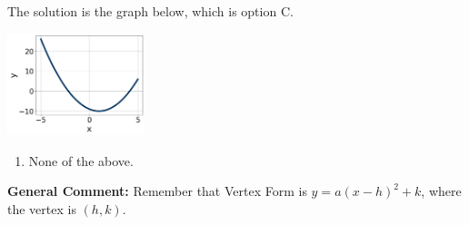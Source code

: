 \documentclass{extbook}[14pt]
\begin{document}
\begin{enumerate}
{The solution is the graph below, which is option C.
\begin{center}
    \includegraphics[width=0.3\textwidth]{../Figures/quadraticEquationToGraphCB.png}
\end{center}\begin{enumerate}[label=\Alph*.]
\item None of the above.\end{enumerate}
\textbf{General Comment:} Remember that Vertex Form is $y = a(x-h)^2+k$, where the vertex is $(h, k)$.
}
\end{enumerate}
\end{document}
